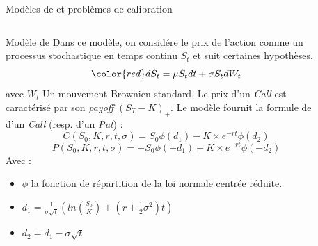 \documentclass[final]{beamer}
\newlength{\sepwid}
\newlength{\onecolwid}
\newlength{\twocolwid}
\begin{document}
\begin{frame}[t]
\begin{columns}[t]
\begin{column}{\sepwid}\end{column} %

\begin{column}{\twocolwid} %

\begin{block}{Modèles de  et problèmes de calibration}

\begin{columns}[t,totalwidth=\twocolwid] %

\begin{column}{\onecolwid} %


\begin{alertblock}{Modèle de }
  Dans ce modèle, on considére le prix de l'action comme un processus stochastique en temps continu $S_t$ et suit certaines hypothèses. \newline
  {
  \[ {\color{red} dS_t = \mu S_t dt + \sigma S_t dW_t} \]}
avec $W_t$ Un mouvement Brownien standard.
\newline
Le prix d'un \textit{Call} est caractérisé par son \textit{payoff} $(S_T - K)_{+}$. \newline
Le modèle fournit la formule de  d'un \textit{Call} (resp. d'un \textit{Put}) :
$$ C(S_0,K,r,t,\sigma) = S_0 \phi(d_1)-K \times e^{-rt} \phi(d_2) $$
$$ P(S_0,K,r,t,\sigma) = -S_0 \phi(-d_1)+K \times e^{-rt} \phi(-d_2) $$
Avec : \begin{itemize}
\item $\phi$ la fonction de répartition de la loi normale centrée réduite.
\item $d_1 = \frac{1}{\sigma \sqrt{t}} (ln(\frac{S_0}{K})+(r+\frac{1}{2}\sigma^2)t) $
\item $d_2 = d_1 - \sigma \sqrt{t}$
\end{itemize}
\end{alertblock}


\end{column} %

\begin{column}{\onecolwid} %


\end{column}
\end{columns}
\end{block}
\end{column}
\end{columns}
\end{frame}
\end{document}
